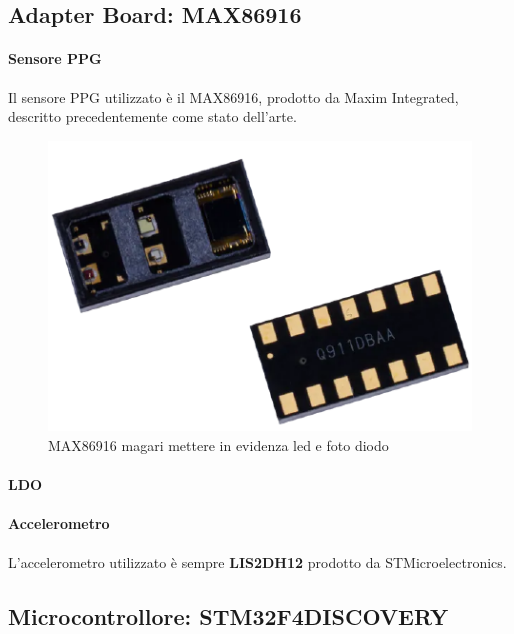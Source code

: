 \pagebreak
\subsection{Adapter Board: MAX86916}

\paragraph{Sensore PPG} Il sensore PPG utilizzato è il MAX86916, prodotto da Maxim Integrated, descritto precedentemente come stato dell'arte.

\begin{figure}[tb]
	\centering
	\includegraphics[width=0.6\linewidth]{ImageFiles/Hardware/ImmagineMAX86916}
	\caption{MAX86916 magari mettere in evidenza led e foto diodo}
	\label{fig:ImmagineMAX86916}
\end{figure}

\paragraph{LDO} 

\paragraph{Accelerometro} L'accelerometro utilizzato è sempre \textbf{LIS2DH12} prodotto da STMicroelectronics.

\subsection{Microcontrollore: STM32F4DISCOVERY}
